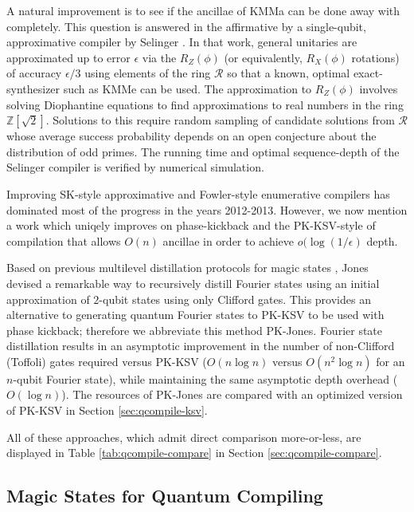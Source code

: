 A natural improvement is to see if the ancillae of KMMa can be done away with
completely. This question is answered in the affirmative by a single-qubit,
approximative compiler by Selinger
\cite{Selinger2012}. In that work, general unitaries are approximated up to
error $\epsilon$ via the $R_Z(\phi)$ (or equivalently, $R_X(\phi)$ rotations)
of accuracy $\epsilon/3$ using elements of the
ring $\mathcal{R}$ so that a known, optimal exact-synthesizer such as KMMe
can be used. The approximation to $R_Z(\phi)$ involves solving
Diophantine equations to find approximations to real numbers in the
ring $\mathbb{Z}\left[\sqrt{2}\right]$. Solutions to this require
random sampling of candidate solutions from $\mathcal{R}$ whose average
success probability depends on an open conjecture about the distribution
of odd primes. The running time and optimal sequence-depth of the
Selinger compiler is verified by numerical simulation.

Improving SK-style approximative and Fowler-style enumerative compilers has
dominated most of the progress in the years 2012-2013. However, we now mention
a work which uniqely improves on phase-kickback and the PK-KSV-style of
compilation that allows $O(n)$ ancillae in order to achieve $o(\log(1/\epsilon)$
depth.

Based on previous multilevel distillation protocols for magic states \cite{Jones2012},
Jones devised a remarkable way to recursively distill Fourier states using an
initial approximation of $2$-qubit states using only Clifford gates. This provides
an alternative to generating quantum Fourier states to PK-KSV to be used with
phase kickback; therefore we abbreviate this method PK-Jones. Fourier state
distillation results
in an asymptotic improvement in the number of non-Clifford (Toffoli) gates
required versus PK-KSV ($O(n\log n)$ versus $O(n^2\log n)$ for an
$n$-qubit Fourier state), while maintaining the same asymptotic depth overhead
($O(\log n)$). The resources of PK-Jones are compared with an optimized version of PK-KSV in
Section \ref{sec:qcompile-ksv}.

All of these approaches, which admit direct comparison more-or-less, are
displayed in Table \ref{tab:qcompile-compare} in Section
\ref{sec:qcompile-compare}.

\subsection{Magic States for Quantum Compiling}

